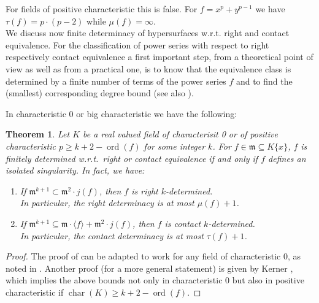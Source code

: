 \documentclass[11pt]{article}
\DeclareMathOperator{\ord}{ord}
\DeclareMathOperator{\Char}{char}
\newtheorem{Theorem}[Definition]{Theorem}
\newcommand{\fm}{\mathfrak{m}}
\begin{document}
   For fields of positive characteristic this is false. For $f=x^p+y^{p-1}$ we have
   $\tau(f)=p\cdot (p-2)$ while $\mu(f)=\infty$. \\
     
We discuss now finite determinacy of hypersurfaces w.r.t. right and contact equivalence. 
For the classification of  power series with
   respect to right respectively 
   contact equivalence a first important step, 
   from a theoretical point of view as well as from a practical one, is
   to know that the equivalence class is determined by a finite number
   of terms of the power series $f$ and to find the (smallest) corresponding degree bound (see also \cite[ Sections 1.2.2 and 3.1.2]{GLS25}).  
 {In characteristic 0 or big characteristic we have the following:
\begin{Theorem}  \label{rem:det-char0} 
Let $K$ be a real valued field of characterisit 0 or of positive characteristic $p \ge k +2 -\ord(f)$ for some integer $k$.
For $f\in \fm \subseteq K\{x\}$,  $f$ is finitely determined w.r.t.\ right or contact equivalence if and only if $f$
defines an isolated singularity.  In fact, we have:
\begin{enumerate}
\item [(a)] If $\fm^{k+1}\subset\fm^2\cdot j(f)$, then $f$ is right $k$-determined. \\
In particular, the right determinacy is at most
   $\mu(f)+1$.
\item [(b)]  If $\fm^{k+1}\subseteq\fm\cdot\langle f\rangle+\fm^2\cdot j(f)$, then $f$ is  contact $k$-determined. \\ In particular,  the contact determinacy is at most  $\tau(f)+1$.
 \end{enumerate}
\end{Theorem}
\begin{proof}
The proof of \cite[Theorem 1.2.23]{GLS25} can be adapted to work for any field of characteristic $0$, as noted in \cite[Remark 1]{BGM12}. Another proof (for a more general statement) is given by Kerner \cite[Corollary 5.5.]{Ker}, which implies the above bounds  not only in characteristic  $0$ but also in positive characteristic if $\Char(K) \ge k +2 -\ord(f)$.
\end{proof}
}
\end{document}

